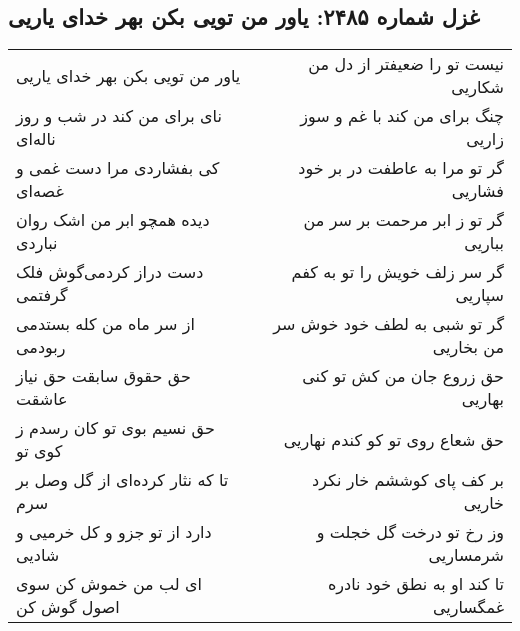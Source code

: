\begin{center}
\section*{غزل شماره ۲۴۸۵: یاور من تویی بکن بهر خدای یاریی}
\label{sec:2485}
\begin{longtable}{l p{0.5cm} r}
یاور من تویی بکن بهر خدای یاریی
&&
نیست تو را ضعیفتر از دل من شکاریی
\\
نای برای من کند در شب و روز ناله‌ای
&&
چنگ برای من کند با غم و سوز زاریی
\\
کی بفشاردی مرا دست غمی و غصه‌ای
&&
گر تو مرا به عاطفت در بر خود فشاریی
\\
دیده همچو ابر من اشک روان نباردی
&&
گر تو ز ابر مرحمت بر سر من بباریی
\\
دست دراز کردمی‌گوش فلک گرفتمی
&&
گر سر زلف خویش را تو به کفم سپاریی
\\
از سر ماه من کله بستدمی ربودمی
&&
گر تو شبی به لطف خود خوش سر من بخاریی
\\
حق حقوق سابقت حق نیاز عاشقت
&&
حق زروع جان من کش تو کنی بهاریی
\\
حق نسیم بوی تو کان رسدم ز کوی تو
&&
حق شعاع روی تو کو کندم نهاریی
\\
تا که نثار کرده‌ای از گل وصل بر سرم
&&
بر کف پای کوششم خار نکرد خاریی
\\
دارد از تو جزو و کل خرمیی و شادیی
&&
وز رخ تو درخت گل خجلت و شرمساریی
\\
ای لب من خموش کن سوی اصول گوش کن
&&
تا کند او به نطق خود نادره غمگساریی
\\
\end{longtable}
\end{center}
